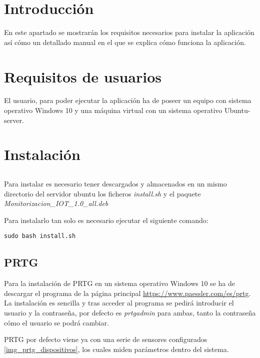 
\section{Introducción}

En este apartado se mostrarán los requisitos necesarios para instalar la aplicación así cómo un detallado manual en el que se explica cómo funciona la aplicación. 

\section{Requisitos de usuarios}

El usuario, para poder ejecutar la aplicación ha de poseer un equipo con sistema operativo Windows 10 y una máquina virtual con un sistema operativo Ubuntu-server.

\section{Instalación}

\subsection{\nombrePrograma}
Para instalar \nombrePrograma es necesario tener descargados y almacenados en un mismo directorio del servidor ubuntu los ficheros \textit{install.sh} y el paquete \textit{Monitorizacion\_IOT\_1.0\_all.deb}

Para instalarlo tan solo es necesario ejecutar el siguiente comando:

\begin{lstlisting}[frame=single]  
sudo bash install.sh
\end{lstlisting}

\subsection{PRTG}
Para la instalación de PRTG en un sistema operativo Windows 10 se ha de descargar el programa de la página principal \url{https://www.paessler.com/es/prtg}. La instalación es sencilla y tras acceder al programa se pedirá introducir el usuario y la contraseña, por defecto es \textit{prtgadmin} para ambas, tanto la contraseña cómo el usuario se podrá cambiar.

PRTG por defecto viene ya con una serie de sensores configurados \ref{img_prtg_dispositivos}, los cuales miden parámetros dentro del sistema.

